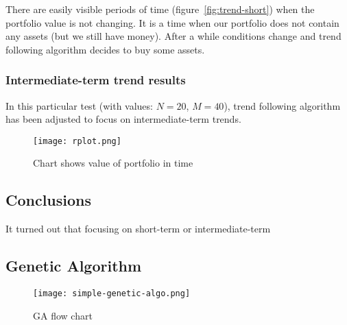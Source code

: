 There are easily visible periods of time (figure~\ref{fig:trend-short}) when the portfolio value is not changing. 
It is a time when our portfolio does not contain any assets (but we still have money). 
After a while conditions change and trend following algorithm decides to buy some assets.


\subsubsection{Intermediate-term trend results}

In this particular test (with values: $N = 20$, $M = 40$), trend following algorithm has been adjusted to focus on intermediate-term trends.
 
\begin{figure}[H]
  \begin{center}
    \texttt{[image: rplot.png]}
  \end{center}
  \caption{Chart shows value of portfolio in time}
\end{figure}

\subsection{Conclusions}

It turned out that focusing on short-term or intermediate-term 


\subsection{Genetic Algorithm}

\begin{figure}[H]
  \begin{center}
    \texttt{[image: simple-genetic-algo.png]}
  \end{center}
  \caption{GA flow chart \cite{Haupt:2004:PGA:1007746}}
\end{figure}


